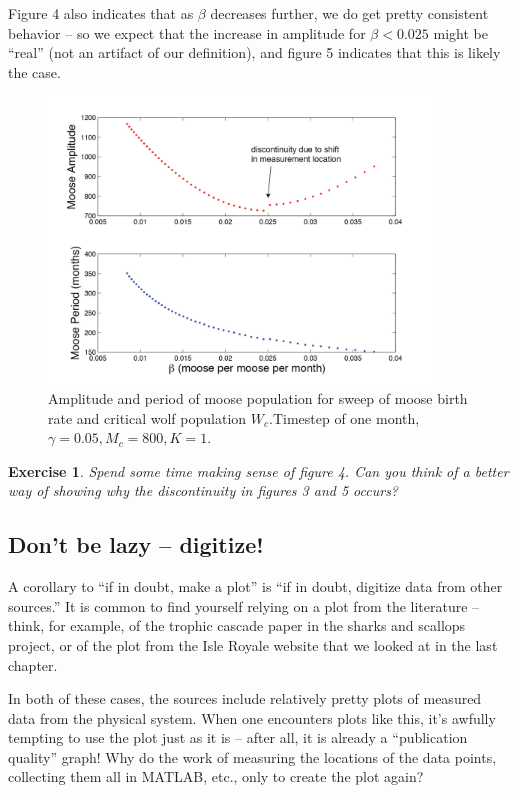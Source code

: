 \documentclass{tufte-handout}
\newtheorem{del}{Exercise}
\begin{document}
Figure 4 also indicates that as $\beta$ decreases further, we do get pretty consistent behavior -- so we expect that the increase in amplitude for $\beta < 0.025$ might be ``real'' (not an artifact of our definition), and figure 5 indicates that this is likely the case.
  
\begin{figure}[h!]
\includegraphics[width=4in]{figs/BroaderBCSweep}
\caption{Amplitude and period of moose population for sweep of moose birth rate and critical wolf population $W_c$.Timestep of one month,  $\gamma = 0.05, M_c = 800, K=1$.}
\end{figure}

\begin{del}
Spend some time making sense of figure 4.  Can you think of a better way of showing why the discontinuity in figures 3 and 5 occurs?
\end{del}
\subsection{Don't be lazy -- digitize!}

A corollary to ``if in doubt, make  a plot''  is ``if in doubt, digitize data from other sources.''   It is common to find yourself relying on a plot from the literature -- think, for example, of the trophic cascade paper in the sharks and scallops project, or of the plot from the Isle Royale website that we looked at in the last chapter.  

In both of these cases, the sources include relatively pretty plots of measured data from the physical system.  When one encounters plots like this, it's awfully tempting to use the plot just as it is -- after all, it is already a ``publication quality'' graph!  Why do the work of measuring the locations of the data points, collecting them all in MATLAB, etc., only to create the plot again?
\end{document}
